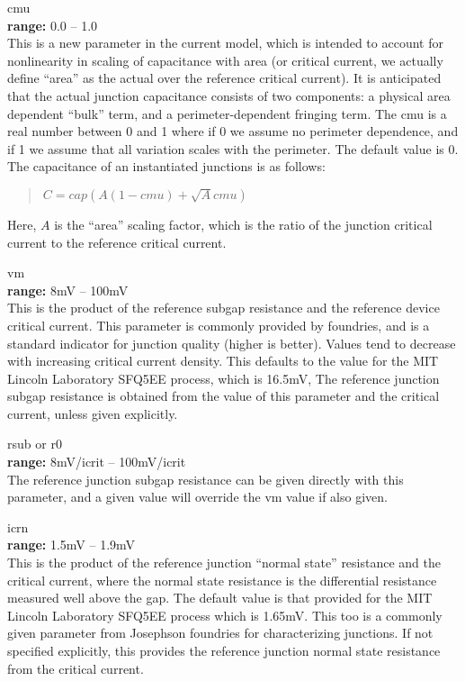 \begin{description}
\item{\vt cmu}\\
{\bf range:} 0.0 -- 1.0\\
This is a new parameter in the current model, which is intended to
account for nonlinearity in scaling of capacitance with area (or
critical current, we actually define ``area'' as the actual over the
reference critical current).  It is anticipated that the actual
junction capacitance consists of two components:  a physical area
dependent ``bulk'' term, and a perimeter-dependent fringing term.  The
{\vt cmu} is a real number between 0 and 1 where if 0 we assume no
perimeter dependence, and if 1 we assume that all variation scales
with the perimeter.  The default value is 0.  The capacitance of an
instantiated junctions is as follows:
\begin{quote}
$C = cap (A(1-cmu) + \sqrt{A} cmu)$
\end{quote}
Here, $A$ is the ``area'' scaling factor, which is the ratio of the
junction critical current to the reference critical current.

\item{\vt vm}\\
{\bf range:} 8mV -- 100mV\\
This is the product of the reference subgap resistance and the
reference device critical current.  This parameter is commonly
provided by foundries, and is a standard indicator for junction
quality (higher is better).  Values tend to decrease with increasing
critical current density.  This defaults to the value for the MIT
Lincoln Laboratory SFQ5EE process\cite{tolpygo}, which is 16.5mV, The
reference junction subgap resistance is obtained from the value of
this parameter and the critical current, unless given explicitly.

\item{{\vt rsub} or {\vt r0}}\\
{\bf range:} 8mV/{\vt icrit} -- 100mV/{\vt icrit}\\
The reference junction subgap resistance can be given directly
with this parameter, and a given value will override the
{\vt vm} value if also given.

\item{\vt icrn}\\
{\bf range:} 1.5mV -- 1.9mV\\
This is the product of the reference junction ``normal state''
resistance and the critical current, where the normal state resistance
is the differential resistance measured well above the gap.  The
default value is that provided for the MIT Lincoln Laboratory SFQ5EE
process\cite{tolpygo} which is 1.65mV.  This too is a commonly given
parameter from Josephson foundries for characterizing junctions.  If
not specified explicitly, this provides the reference junction normal
state resistance from the critical current.


\end{description}
